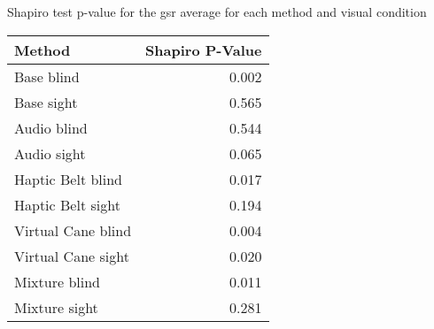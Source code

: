 
\centering
\caption{Shapiro test p-value for the gsr average for each method and visual condition}
\label{tab:shapiro_gsr}
\begin{tabular}{lr}
\toprule
            Method &  Shapiro P-Value \\
\midrule
        Base blind &            0.002 \\
        Base sight &            0.565 \\
       Audio blind &            0.544 \\
       Audio sight &            0.065 \\
 Haptic Belt blind &            0.017 \\
 Haptic Belt sight &            0.194 \\
Virtual Cane blind &            0.004 \\
Virtual Cane sight &            0.020 \\
     Mixture blind &            0.011 \\
     Mixture sight &            0.281 \\
\bottomrule
\end{tabular}
